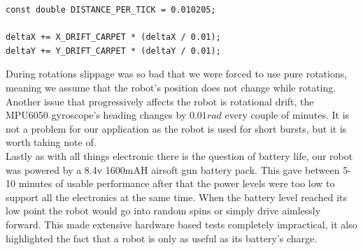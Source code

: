 \begin{lstlisting}
const double DISTANCE_PER_TICK = 0.010205;

deltaX += X_DRIFT_CARPET * (deltaX / 0.01);
deltaY += Y_DRIFT_CARPET * (deltaY / 0.01);
\end{lstlisting}

\noindent
During rotations slippage was so bad that we were forced to use pure rotations, meaning we assume that the robot's position does not change while rotating. Another issue that progressively affects the robot is rotational drift, the MPU6050 gyroscope's heading changes by $0.01rad$ every couple of minutes. It is not a problem for our application as the robot is used for short bursts, but it is worth taking note of. \\

\noindent
Lastly as with all things electronic there is the question of battery life, our robot was powered by a 8.4v 1600mAH airsoft gun battery pack. This gave between 5-10 minutes of usable performance after that the power levels were too low to support all the electronics at the same time. When the battery level reached its low point the robot would go into random spins or simply drive aimlessly forward. This made extensive hardware based tests completely impractical, it also highlighted the fact that a robot is only as useful as its battery's charge.

